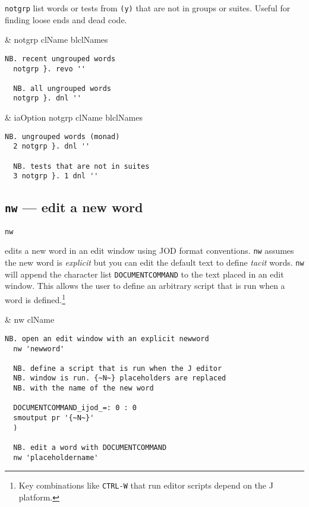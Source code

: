 \texttt{notgrp} list words or tests from \texttt{(y)} that are not in groups or
suites. Useful for finding loose ends and dead code.

\begin{wordhead}
\monad & notgrp clName \argsep blclNames \\
\end{wordhead}
\begin{lstlisting}[frame=single,framerule=0pt] 
  NB. recent ungrouped words
  notgrp }. revo ''  
  
  NB. all ungrouped words
  notgrp }. dnl ''  
\end{lstlisting}

\begin{wordhead}
\dyad & iaOption notgrp clName \argsep blclNames \\
\end{wordhead}
\begin{lstlisting}[frame=single,framerule=0pt]
  NB. ungrouped words (monad)
  2 notgrp }. dnl ''    

  NB. tests that are not in suites
  3 notgrp }. 1 dnl ''
\end{lstlisting}

\subsection{\texttt{nw} --- edit a new word}\label{ss:nw} 

\hypertarget{il:nw}{\texttt{nw}} edits a new  word in 
an edit window using JOD format conventions. \texttt{nw} assumes the
new word is  \emph{explicit} but you can edit the default text to define \emph{tacit} words. 
\texttt{nw} will append the 
character list \texttt{DOCUMENTCOMMAND} to the text placed in an edit window.  
This allows the user to define an arbitrary script that is run when a word is defined.\footnote{Key combinations
like \texttt{CTRL-W} that run editor scripts depend on the J platform.
}

\begin{wordhead}
\monad & nw clName \\
\end{wordhead}
\begin{lstlisting}[frame=single,framerule=0pt] 
  NB. open an edit window with an explicit newword
  nw 'newword'  

  NB. define a script that is run when the J editor
  NB. window is run. {~N~} placeholders are replaced
  NB. with the name of the new word

  DOCUMENTCOMMAND_ijod_=: 0 : 0
  smoutput pr '{~N~}'
  )

  NB. edit a word with DOCUMENTCOMMAND
  nw 'placeholdername'
\end{lstlisting}

